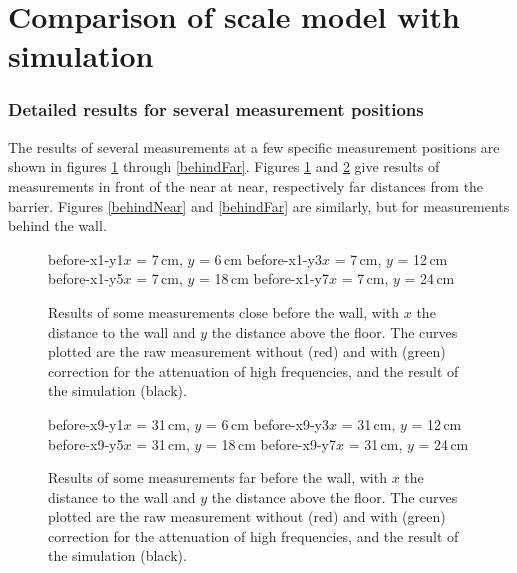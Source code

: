 \section{Comparison of scale model with simulation \label{sectComparison}}

\subsubsection*{Detailed results for several measurement positions}
The results of several measurements at a few specific measurement positions are shown in figures \ref{beforeNear} through \ref{behindFar}. Figures \ref{beforeNear} and \ref{beforeFar} give results of measurements in front of the near at near, respectively far distances from the barrier. Figures \ref{behindNear} and \ref{behindFar} are similarly, but for measurements behind the wall.


\begin{figure}
\figOctaveTwoNoFigNoCaption{-0.0cm}
	{before-x1-y1}{$x$ = 7\,cm, $y$ = 6\,cm}
	{before-x1-y3}{$x$ = 7\,cm, $y$ = 12\,cm}
\figOctaveTwoNoFigNoCaption{-0.0cm}
	{before-x1-y5}{$x$ = 7\,cm, $y$ = 18\,cm}
	{before-x1-y7}{$x$ = 7\,cm, $y$ = 24\,cm}
\caption{Results of some measurements close before the wall, with $x$ the distance to the wall and $y$ the distance above the floor. The curves plotted are the raw measurement without (red) and with (green) correction for the attenuation of high frequencies, and the result of the simulation (black). \label{beforeNear}}
\end{figure}
\begin{figure}
\figOctaveTwoNoFigNoCaption{-0.0cm}
	{before-x9-y1}{$x$ = 31\,cm, $y$ = 6\,cm}
	{before-x9-y3}{$x$ = 31\,cm, $y$ = 12\,cm}
\figOctaveTwoNoFigNoCaption{-0.0cm}
	{before-x9-y5}{$x$ = 31\,cm, $y$ = 18\,cm}
	{before-x9-y7}{$x$ = 31\,cm, $y$ = 24\,cm}
\caption{Results of some measurements far before the wall, with $x$ the distance to the wall and $y$ the distance above the floor. The curves plotted are the raw measurement without (red) and with (green) correction for the attenuation of high frequencies, and the result of the simulation (black). \label{beforeFar}}
\end{figure}


